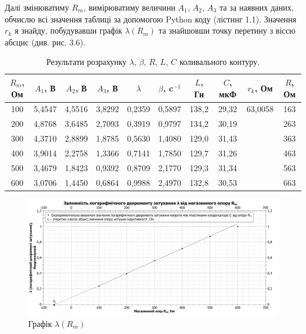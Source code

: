 \documentclass[12pt,a4paper]{article}
\begin{document}
    \vspace{1em} %
    \setlength{\parindent}{1.5em}

    Далі змінюватиму $R_m$, вимірюватиму величини $A_1$, $A_2$, $A_3$ та за наявних даних, обчислю всі значення таблиці за допомогою Python коду (лістинг 1.1).
    Значення $r_k$ я знайду, побудувавши графік $\lambda(R_m)$ та знайшовши точку перетину з віссю абсцис (див. рис. 3.6).

    \begin{table}[h!]
        \centering
        \renewcommand{\arraystretch}{1.2} %
        \begin{tabular}{|c|c|c|c|c|c|c|c|c|c|}
            \hline
            $R_m$, Ом & $A_1$, В & $A_2$, В & $A_3$, В & $\lambda$ & $\beta$, c$^{-1}$ & $L$, Гн & $C$, мкФ & $r_k$, Ом & $R$, Ом \\[3pt]
            \hline
            100 & 5,4547 & 4,5516 & 3,8292 & 0,2359 & 0,5897 & 138,2 & 29,32 & 63,0058 & 163 \\[3pt]
            200 & 4,8768 & 3,6485 & 2,7093 & 0,3919 & 0,9797 & 134,2 & 30,19 & & 263 \\[3pt]
            300 & 4,3710 & 2,8899 & 1,8785 & 0,5630 & 1,4080 & 129,0 & 31,43 & & 363 \\[3pt]
            400 & 3,9014 & 2,2758 & 1,3366 & 0,7141 & 1,7850 & 129,7 & 31,26 & & 463 \\[3pt]
            500 & 3,4679 & 1,8423 & 0,9392 & 0,8709 & 2,1770 & 129,3 & 31,34 & & 563 \\[3pt]
            600 & 3,0706 & 1,4450 & 0,6864 & 0,9988 & 2,4970 & 132,8 & 30,53 & & 663 \\[3pt]
            \hline
        \end{tabular}
        \caption{Результати розрахунку $\lambda$, $\beta$, $R$, $L$, $C$ коливального контуру.}
    \end{table}

    \begin{figure}[h!]

        \renewcommand{\thefigure}{3.\arabic{figure}} %

        \centering
        \includegraphics[width=1.00\textwidth]{graph.png}
        \caption{Графік $\lambda(R_m)$}
        \label{graph:schema}

    \end{figure}
\end{document}

